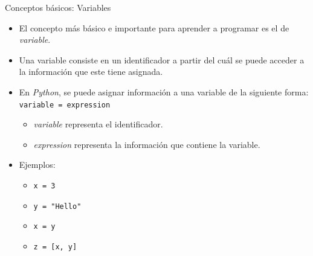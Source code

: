 \documentclass{beamer}
\begin{document}
    \begin{frame}{Conceptos básicos: Variables}
        \begin{itemize}
            \item El concepto más básico e importante para aprender a programar es el de \emph{variable}.
            \item Una variable consiste en un identificador a partir del cuál se puede acceder a la información que este tiene asignada.
            \item En \emph{Python}, se puede asignar información a una variable de la siguiente forma: \texttt{variable = expression}
            \begin{itemize}
                \item \emph{variable} representa el identificador.
                \item \emph{expression} representa la información que contiene la variable.
            \end{itemize}
            \item Ejemplos:
            \begin{itemize}
                \item \texttt{x = 3}
                \item \texttt{y = "Hello"}
                \item \texttt{x = y}
                \item \texttt{z = [x, y]}
            \end{itemize}
        \end{itemize}
    \end{frame}
\end{document}
